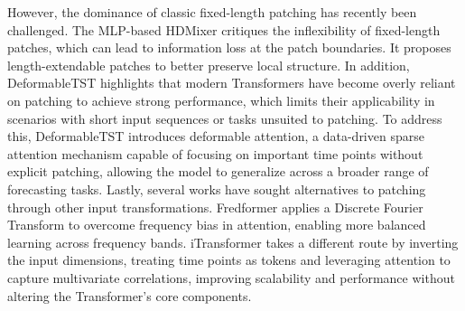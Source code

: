 \documentclass[a4paper,oneside,bibliography=totoc]{scrbook}
\begin{document}
However, the dominance of classic fixed-length patching has recently been challenged. 
The MLP-based HDMixer \cite{huang_hdmixer_2024} critiques the inflexibility of fixed-length patches, which can lead to information loss at the patch boundaries. It proposes length-extendable patches to better preserve local structure.
In addition, DeformableTST \cite{luo_deformabletst_2024} highlights that modern Transformers have become overly reliant on patching to achieve strong performance, which limits their applicability in scenarios with short input sequences or tasks unsuited to patching. To address this, DeformableTST introduces deformable attention, a data-driven sparse attention mechanism capable of focusing on important time points without explicit patching, allowing the model to generalize across a broader range of forecasting tasks. 
Lastly, several works have sought alternatives to patching through other input transformations. 
Fredformer \cite{piao_fredformer_2024} applies a Discrete Fourier Transform to overcome frequency bias in attention, enabling more balanced learning across frequency bands. 
iTransformer \cite{liu_itransformer_2023} takes a different route by inverting the input dimensions, treating time points as tokens and leveraging attention to capture multivariate correlations, improving scalability and performance without altering the Transformer’s core components. 
\end{document}
